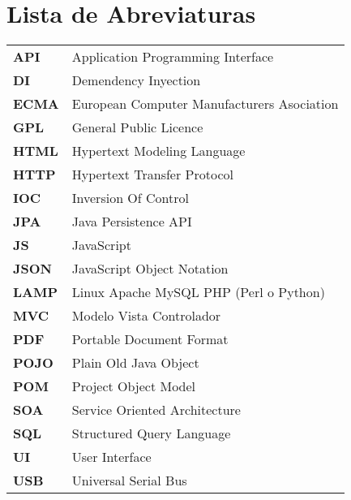 \chapter*{Lista de Abreviaturas}
\begin{table*}[h!]
    \begin{center}
        \begin{tabular}{ll}
            \textbf{API} & Application Programming Interface\\
            \textbf{DI} & Demendency Inyection\\
            \textbf{ECMA} & European Computer Manufacturers Asociation\\
            \textbf{GPL} & General Public Licence\\
            \textbf{HTML} & Hypertext Modeling Language\\
            \textbf{HTTP} & Hypertext Transfer Protocol\\
            \textbf{IOC} & Inversion Of Control\\
            \textbf{JPA} & Java Persistence API\\
            \textbf{JS} & JavaScript\\
            \textbf{JSON} & JavaScript Object Notation\\
            \textbf{LAMP} & Linux Apache MySQL PHP (Perl o Python)\\
            \textbf{MVC} & Modelo Vista Controlador\\
            \textbf{PDF} & Portable Document Format\\
            \textbf{POJO} & Plain Old Java Object\\
            \textbf{POM} & Project Object Model\\
            \textbf{SOA} & Service Oriented Architecture\\
            \textbf{SQL} & Structured Query Language\\
            \textbf{UI} & User Interface\\
            \textbf{USB} & Universal Serial Bus\\
        \end{tabular}
    \end{center}
\end{table*}